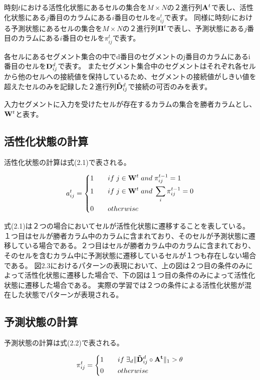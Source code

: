 時刻$t$における活性化状態にあるセルの集合を$M \times N$の２進行列${\bf A}^t$で表し、活性化状態にある$j$番目のカラムにある$i$番目のセルを$a^t_{ij}$で表す。
同様に時刻$t$における予測状態にあるセルの集合を$M \times N$の２進行列${\bf \Pi}^t$で表し、予測状態にある$j$番目のカラムにある$i$番目のセルを$\pi^t_{ij}$で表す。

各セルにあるセグメント集合の中でd番目のセグメントのj番目のカラムにあるi番目のセルを${\bf D}^d_{ij}$で表す。
またセグメント集合中のセグメントはそれぞれ各セルから他のセルへの接続値を保持しているため、セグメントの接続値がしきい値を超えたセルのみを記録した２進行列${\bf \tilde{D}}^d_{ij}$で接続の可否のみを表す。

入力セグメントに入力を受けたセルが存在するカラムの集合を勝者カラムとし、${\bf W}^t$と表す。

\subsection{活性化状態の計算}
活性化状態の計算は式(2.1)で表される。

\begin{equation}
  a^t_{ij} =
  \left\{
  \begin{alignedat}{3}
    1 \qquad &if \; j\in{\bf W}^t \; and \; \pi^{t-1}_{ij} = 1\\
    1 \qquad &if \; j\in{\bf W}^t \; and \; \sum_i \pi^{t-1}_{ij} = 0\\
    0 \qquad &otherwise
  \end{alignedat}
  \right.
\end{equation}

式(2.1)は２つの場合においてセルが活性化状態に遷移することを表している。
１つ目はセルが勝者カラム中のカラムに含まれており、そのセルが予測状態に遷移している場合である。２つ目はセルが勝者カラム中のカラムに含まれており、そのセルを含むカラム中に予測状態に遷移しているセルが１つも存在しない場合である。
図2.3におけるパターンの表現において、上の図は２つ目の条件のみによって活性化状態に遷移した場合で、下の図は１つ目の条件のみによって活性化状態に遷移した場合である。
実際の学習では２つの条件による活性化状態が混在した状態でパターンが表現される。

\subsection{予測状態の計算}
予測状態の計算は式(2.2)で表される。

\begin{equation}
  \pi^t_{ij} =
  \left\{
  \begin{alignedat}{2}
    1 \qquad &if \; \exists_d\|{\bf \tilde{D}}^d_{ij} \circ {\bf A^t}\|_1 > \theta\\
    0 \qquad &otherwise
  \end{alignedat}
  \right.
\end{equation}

